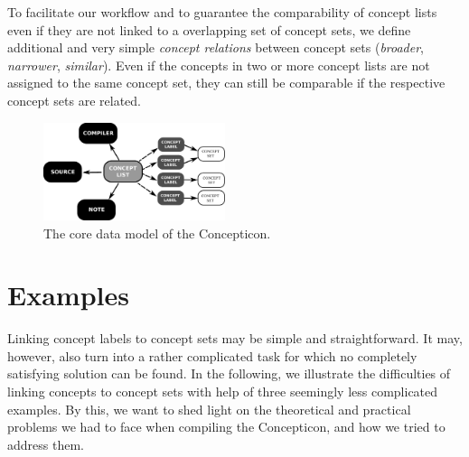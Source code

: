 \documentclass[10pt, a4paper]{article}
\begin{document}
To facilitate our workflow and to guarantee the comparability of concept lists even if they are
not linked to a overlapping set of concept sets, we define additional and very simple
\emph{concept relations} between concept sets (\emph{broader}, \emph{narrower}, \emph{similar}).
Even if the concepts in two or more concept lists are not assigned to the same concept set, they can
still be comparable if the respective concept sets are related.

\begin{figure}[h]
  \includegraphics[width=0.475\textwidth]{img/concepticon.pdf}
  \caption{The core data model of the Concepticon.}
  \label{fig:concepticon}
\end{figure}



\section{Examples}
\noindent Linking concept labels to concept sets may be simple and straightforward. It may, however, also turn
into a rather complicated task for which no completely satisfying solution can be found.  In the
following, we illustrate the difficulties of linking concepts to concept sets with help of three
seemingly less complicated examples. By this, we want to shed light on the theoretical and practical
problems we had to face when compiling the Concepticon, and how we tried to address them.
\end{document}
